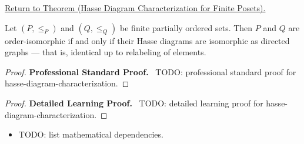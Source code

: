 \newpage
{}
\label{prf:hasse-diagram-characterization}

\begin{remark*}[Return]
\hyperref[prop:hasse-diagram-characterization]{Return to Theorem (Hasse Diagram Characterization for Finite Posets).}
\end{remark*}

\begin{theorem*}
Let $(P, \leq_P)$ and $(Q, \leq_Q)$ be finite partially ordered sets.
Then $P$ and $Q$ are order-isomorphic if and only if their Hasse diagrams
are isomorphic as directed graphs — that is, identical up to relabeling
of elements.
\end{theorem*}

\begin{proof}
\textbf{Professional Standard Proof.}~
TODO: professional standard proof for hasse-diagram-characterization.
\end{proof}

\begin{proof}
\textbf{Detailed Learning Proof.}~
TODO: detailed learning proof for hasse-diagram-characterization.
\end{proof}

\begin{remark*}
\end{remark*}

\begin{dependencies}
\begin{itemize}
  \item TODO: list mathematical dependencies.
\end{itemize}
\end{dependencies}

\clearpage

